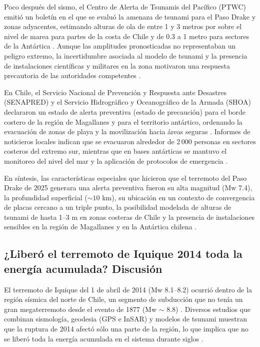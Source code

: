 \documentclass[a4paper,12pt]{article} %
\numberwithin{equation}{section} %
\numberwithin{figure}{section} %
\begin{document}
Poco después del sismo, el Centro de Alerta de Tsunamis del Pacífico (PTWC) emitió un boletín en el que se evaluó la amenaza de tsunami para el Paso Drake y zonas adyacentes, estimando alturas de ola de entre 1 y 3 metros por sobre el nivel de marea para partes de la costa de Chile y de 0.3 a 1 metro para sectores de la Antártica \cite{PTWC_Drake2025}. Aunque las amplitudes pronosticadas no representaban un peligro extremo, la incertidumbre asociada al modelo de tsunami y la presencia de instalaciones científicas y militares en la zona motivaron una respuesta precautoria de las autoridades competentes \cite{PTWC_Drake2025,USAToday_Drake2025,CGTN_Drake2025}.

En Chile, el Servicio Nacional de Prevención y Respuesta ante Desastres (SENAPRED) y el Servicio Hidrográfico y Oceanográfico de la Armada (SHOA) declararon un estado de alerta preventiva (estado de precaución) para el borde costero de la región de Magallanes y para el territorio antártico, ordenando la evacuación de zonas de playa y la movilización hacia áreas seguras \cite{DW_Drake2025,Reuters_Drake2025,USAToday_Drake2025}. Informes de noticieros locales indican que se evacuaron alrededor de 2\,000 personas en sectores costeros del extremo sur, mientras que en bases antárticas se mantuvo el monitoreo del nivel del mar y la aplicación de protocolos de emergencia \cite{DW_Drake2025,Reuters_Drake2025}.

En síntesis, las características especiales que hicieron que el terremoto del Paso Drake de 2025 generara una alerta preventiva fueron su alta magnitud (Mw 7.4), la profundidad superficial (\(\sim 10\) km), su ubicación en un contexto de convergencia de placas cercano a un triple punto, la posibilidad modelada de alturas de tsunami de hasta 1--3 m en zonas costeras de Chile y la presencia de instalaciones sensibles en la región de Magallanes y en la Antártica chilena \cite{USGS_Drake2025,PTWC_Drake2025,Reuters_Drake2025,Wikipedia_Drake2025}.


\subsection{¿Liberó el terremoto de Iquique 2014 toda la energía acumulada? Discusión}

El terremoto de Iquique del 1 de abril de 2014 (Mw 8.1--8.2) ocurrió dentro de la región sísmica del norte de Chile, un segmento de subducción que no tenía un gran megaterremoto desde el evento de 1877 (Mw $\sim$ 8.8) \cite{USGS_Iquique2014,Hayes_Iquique2014}. Diversos estudios que combinan sismología, geodesia (GPS e InSAR) y modelos de tsunami muestran que la ruptura de 2014 afectó sólo una parte de la región, lo que implica que no se liberó toda la energía acumulada en el sistema durante siglos \cite{Hayes_Iquique2014,Duputel_Iquique2015,Watada_Iquique2014}.
\end{document}
